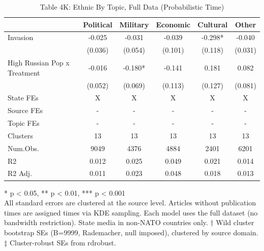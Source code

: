 \begin{table}[!t]
\caption{Table 4K: Ethnic By Topic, Full Data (Probabilistic Time)} 
\fontsize{12.0pt}{14.4pt}\selectfont
\begin{tabular*}{\linewidth}{@{\extracolsep{\fill}}lccccc}
\toprule
  & Political & Military & Economic & Cultural & Other \\ 
\midrule\addlinespace[2.5pt]
Invasion & -0.025 & -0.031 & -0.039 & -0.298* & -0.040 \\ 
 & (0.036) & (0.054) & (0.101) & (0.118) & (0.031) \\ 
High Russian Pop x Treatment & -0.016 & -0.180* & -0.141 & 0.181 & 0.082 \\ 
{} & {(0.052)} & {(0.069)} & {(0.113)} & {(0.127)} & {(0.081)} \\ 
State FEs & X & X & X & X & X \\ 
Source FEs & - & - & - & - & - \\ 
Topic FEs & - & - & - & - & - \\ 
Clusters & 13 & 13 & 13 & 13 & 13 \\ 
Num.Obs. & 9049 & 4376 & 4884 & 2401 & 6201 \\ 
R2 & 0.012 & 0.025 & 0.049 & 0.021 & 0.014 \\ 
R2 Adj. & 0.011 & 0.023 & 0.048 & 0.018 & 0.013 \\ 
\bottomrule
\end{tabular*}
\begin{minipage}{\linewidth}
* p < 0.05, ** p < 0.01, *** p < 0.001\\
All standard errors are clustered at the source level. Articles without
publication times are assigned times via KDE sampling. Each model uses the full
dataset (no bandwidth restriction). State media in non-NATO countries only.
† Wild cluster bootstrap SEs (B=9999, Rademacher, null imposed), clustered by
source domain. ‡ Cluster-robust SEs from rdrobust.\\
\end{minipage}
\end{table}

